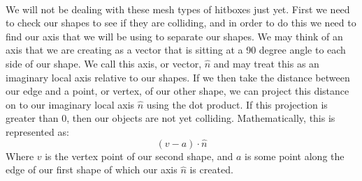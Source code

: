 \documentclass[12pt, letterpaper]{report}
\begin{document}
	\paragraph{} We will not be dealing with these mesh types of hitboxes just yet. First we need to check our shapes to see if they are colliding, and in order to do this we need to find our axis that we will be using to separate our shapes. We may think of an axis that we are creating as a vector that is sitting at a 90 degree angle to each side of our shape. We call this axis, or vector, $\hat{n}$ and may treat this as an imaginary local axis relative to our shapes. If we then take the distance between our edge and a point, or vertex, of our other shape, we can project this distance on to our imaginary local axis $\hat{n}$ using the dot product. If this projection is greater than 0, then our objects are not yet colliding. Mathematically, this is represented as:
	\begin{equation*}
	\left(v-a\right)\cdot\hat{n}
	\end{equation*}
Where $v$ is the vertex point of our second shape, and $a$ is some point along the edge of our first shape of which our axis $\hat{n}$ is created.
\end{document}
